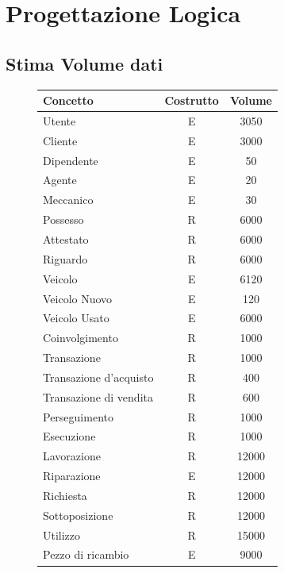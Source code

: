 \documentclass[a4paper,12pt]{report}
\begin{document}
\chapter{Progettazione Logica}

\section{Stima Volume dati}
\begin{figure}[H]
	\fontsize{14pt}{12pt}\selectfont
	\advance\leftskip-15cm
	\centering
	\begin{tabular}{l c c }
		\rowcolor{BlueGreen}
		\rule[-3mm]{0mm}{0.85cm}
		\textbf{Concetto} & \textbf{Costrutto} &\textbf{Volume} \\
		\hline\rule[-2mm]{0mm}{0.75cm}
		Utente & E & 3050\\
		\hline\rule[-2mm]{0mm}{0.75cm}
		Cliente & E & 3000 \\
		\hline\rule[-2mm]{0mm}{0.75cm}
		Dipendente & E & 50\\
		\hline\rule[-2mm]{0mm}{0.75cm}
		Agente & E & 20\\
		\hline\rule[-2mm]{0mm}{0.75cm}
		Meccanico & E & 30\\
		\hline\rule[-2mm]{0mm}{0.75cm}
		Possesso & R & 6000 \\
		\hline\rule[-2mm]{0mm}{0.75cm}
		Attestato & R & 6000\\
		\hline\rule[-2mm]{0mm}{0.75cm}
		Riguardo & R & 6000 \\
		\hline\rule[-2mm]{0mm}{0.75cm}
		Veicolo & E & 6120 \\
		\hline\rule[-2mm]{0mm}{0.75cm}
		Veicolo Nuovo & E & 120 \\
		\hline\rule[-2mm]{0mm}{0.75cm}
		Veicolo Usato & E & 6000 \\
		\hline\rule[-2mm]{0mm}{0.75cm}
		Coinvolgimento & R & 1000\\
		\hline\rule[-2mm]{0mm}{0.75cm}
		Transazione & R & 1000\\
		\hline\rule[-2mm]{0mm}{0.75cm}
		Transazione d'acquisto& R & 400\\
		\hline\rule[-2mm]{0mm}{0.75cm}
		Transazione di vendita& R & 600\\
		\hline\rule[-2mm]{0mm}{0.75cm}
		Perseguimento & R & 1000\\
		\hline\rule[-2mm]{0mm}{0.75cm}
		Esecuzione & R & 1000\\
		\hline\rule[-2mm]{0mm}{0.75cm}
		Lavorazione & R & 12000\\
		\hline\rule[-2mm]{0mm}{0.75cm}
		Riparazione & E & 12000\\
		\hline\rule[-2mm]{0mm}{0.75cm}
		Richiesta & R & 12000\\
		\hline\rule[-2mm]{0mm}{0.75cm}
		Sottoposizione & R & 12000\\
		\hline\rule[-2mm]{0mm}{0.75cm}
		Utilizzo & R & 15000\\
		\hline\rule[-2mm]{0mm}{0.75cm}
		Pezzo di ricambio & E &  9000\\
		\hline
	\end{tabular}
\end{figure}
\end{document}
